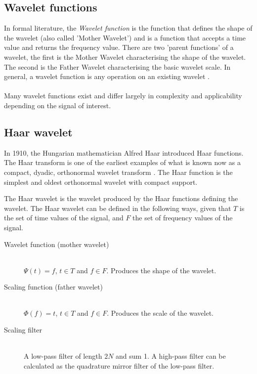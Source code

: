 \subsection{Wavelet functions}
In formal literature, the \emph{Wavelet function }\rm is the function that
defines the shape of the wavelet (also called 'Mother Wavelet') and is a
function that accepts a time value and returns the frequency value. There are
two 'parent functions' of a wavelet, the first is the Mother Wavelet
characterising the shape of the wavelet. The second is the Father Wavelet
characterising the basic wavelet scale. In general, a wavelet function is any
operation on an existing wavelet \cite{wadkar}.

\paragraph{}
Many wavelet functions exist and differ largely in complexity and applicability
depending on the signal of interest.

\subsection{Haar wavelet}
In 1910, the Hungarian mathematician Alfred Haar introduced Haar functions. The
Haar transform is one of the earliest examples of what is known now as a
compact, dyadic, orthonormal wavelet transform \cite{stankovic}. The Haar function
is the simplest and oldest orthonormal wavelet with compact support.

The Haar wavelet is the wavelet produced by the Haar functions defining the
wavelet. The Haar wavelet can be defined in the following ways, given that $T$
is the set of time values of the signal, and $F$ the set of frequency values of
the signal.
\begin{description}
	\item[Wavelet function (mother wavelet)] \hfill \\ $\Psi(t) = f$, $t \in T$ and
	$f \in F$. Produces the shape of the wavelet.
	\item[Scaling function (father wavelet)] \hfill \\ $\Phi(f) = t$, $t \in T$ and
	$f \in F$. Produces the scale of the wavelet.
	\item[Scaling filter] \hfill \\ A low-pass filter of length $2N$ and sum 1. A
	high-pass filter can be calculated as the quadrature mirror filter of the
	low-pass filter.
\end{description}

